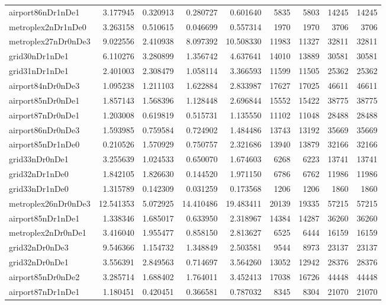\begin{longtable}{|l|r|r|r|r|r|r|r|r|}
airport86nDr1nDe1 & 3.177945 & 0.320913 & 0.280727 & 0.601640 & 5835 & 5803 & 14245 & 14245 \\
metroplex2nDr1nDe0 & 3.263158 & 0.510615 & 0.046699 & 0.557314 & 1970 & 1970 & 3706 & 3706 \\
metroplex27nDr0nDe3 & 9.022556 & 2.410938 & 8.097392 & 10.508330 & 11983 & 11327 & 32811 & 32811 \\
grid30nDr1nDe1 & 6.110276 & 3.280899 & 1.356742 & 4.637641 & 14010 & 13889 & 30581 & 30581 \\
grid31nDr1nDe1 & 2.401003 & 2.308479 & 1.058114 & 3.366593 & 11599 & 11505 & 25362 & 25362 \\
airport84nDr0nDe3 & 1.095238 & 1.211103 & 1.622884 & 2.833987 & 17627 & 17025 & 46611 & 46611 \\
airport85nDr0nDe1 & 1.857143 & 1.568396 & 1.128448 & 2.696844 & 15552 & 15422 & 38775 & 38775 \\
airport87nDr0nDe1 & 1.203008 & 0.619819 & 0.515731 & 1.135550 & 11102 & 11048 & 28488 & 28488 \\
airport86nDr0nDe3 & 1.593985 & 0.759584 & 0.724902 & 1.484486 & 13743 & 13192 & 35669 & 35669 \\
airport85nDr1nDe0 & 0.210526 & 1.570929 & 0.750757 & 2.321686 & 13940 & 13879 & 32166 & 32166 \\
grid33nDr0nDe1 & 3.255639 & 1.024533 & 0.650070 & 1.674603 & 6268 & 6223 & 13741 & 13741 \\
grid32nDr1nDe0 & 1.842105 & 1.826630 & 0.144520 & 1.971150 & 6786 & 6762 & 11986 & 11986 \\
grid33nDr1nDe0 & 1.315789 & 0.142309 & 0.031259 & 0.173568 & 1206 & 1206 & 1860 & 1860 \\
metroplex26nDr0nDe3 & 12.541353 & 5.072925 & 14.410486 & 19.483411 & 20139 & 19335 & 57215 & 57215 \\
airport85nDr1nDe1 & 1.338346 & 1.685017 & 0.633950 & 2.318967 & 14384 & 14287 & 36260 & 36260 \\
metroplex2nDr0nDe1 & 3.416040 & 1.955477 & 0.858150 & 2.813627 & 6525 & 6444 & 16159 & 16159 \\
grid32nDr0nDe3 & 9.546366 & 1.154732 & 1.348849 & 2.503581 & 9544 & 8973 & 23137 & 23137 \\
grid32nDr0nDe1 & 3.556391 & 2.849563 & 0.714697 & 3.564260 & 13052 & 12942 & 28376 & 28376 \\
airport85nDr0nDe2 & 3.285714 & 1.688402 & 1.764011 & 3.452413 & 17038 & 16726 & 44448 & 44448 \\
airport87nDr1nDe1 & 1.180451 & 0.420451 & 0.366581 & 0.787032 & 8345 & 8304 & 21070 & 21070 \\

\end{longtable}
